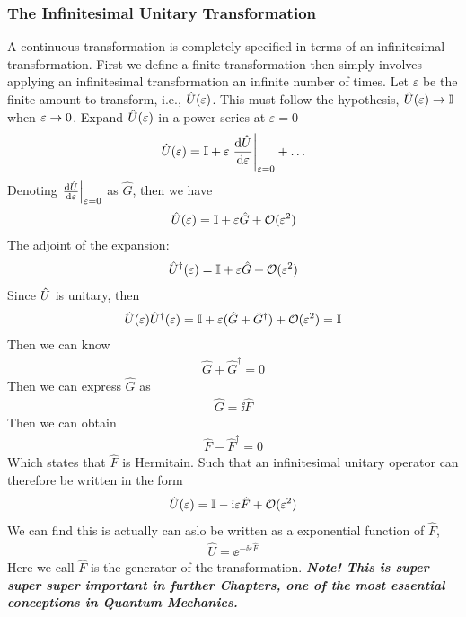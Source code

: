 \subsubsection{The Infinitesimal Unitary Transformation}
A continuous transformation is completely specified in terms of an infinitesimal transformation. First we define a finite transformation then simply involves applying an infinitesimal transformation an infinite number of times. Let $\varepsilon$ be the finite amount to transform, i.e., $\hat{U}(\varepsilon)$. This must follow the hypothesis, $\hat{U}(\varepsilon) \rightarrow \mathbb{I}$ when $\varepsilon \rightarrow 0$. Expand $\hat{U}(\varepsilon)$ in a power series at $\varepsilon=0$
\begin{eqnarray}
    \hat{U}(\varepsilon) = \mathbb{I} + \varepsilon \left. \frac{\mathrm{d} \hat{U}}{\mathrm{d}\varepsilon} \right|_{\varepsilon = 0} + \dots
\end{eqnarray}
Denoting $\left. \frac{\mathrm{d}\hat{U}}{\mathrm{d}\varepsilon} \right|_{\varepsilon = 0}$ as $\hat{G}$, then we have 
\begin{eqnarray}
    \hat{U}(\varepsilon) = \mathbb{I} + \varepsilon \hat{G} + \mathcal{O}(\varepsilon^2)
\end{eqnarray}
The adjoint of the expansion: 
\begin{eqnarray}
    \hat{U}^ \dag (\varepsilon) = \mathbb{I} + \varepsilon \hat{G} + \mathcal{O}(\varepsilon^2)
\end{eqnarray}
Since $\hat{U}$ is unitary, then 
\begin{eqnarray}
    \hat{U}(\varepsilon) \hat{U}^ \dag(\varepsilon) = \mathbb{I} + \varepsilon (\hat{G} + \hat{G}^ \dag) + \mathcal{O}(\varepsilon^2) = \mathbb{I}
\end{eqnarray}
Then we can know 
\begin{eqnarray}
    \hat{G} + \hat{G}^ \dag = 0
\end{eqnarray}
Then we can express $\hat{G}$ as 
\begin{eqnarray}
    \hat{G} = \ii \hat{F}
\end{eqnarray}
Then we can obtain 
\begin{eqnarray}
    \hat{F} - \hat{F}^ \dag =0
\end{eqnarray}
Which states that $\hat{F}$ is Hermitain. Such that an infinitesimal unitary operator can therefore be written in the form
\begin{eqnarray}
    \hat{U}(\varepsilon) = \mathbb{I} - \mathrm{i} \varepsilon \hat{F} + \mathcal{O}(\varepsilon^2) \label{eq:unitary_expansion}
\end{eqnarray}
We can find this is actually can aslo be written as a exponential function of $\hat{F}$,
\begin{eqnarray}
    \hat{U} = \ee^{- \ii \varepsilon \hat{F}} \label{eq:unitary_exponential}
\end{eqnarray}
Here we call $\hat{F}$ is the generator of the transformation. \emph{\textbf{Note! This is super super super important in further Chapters, one of the most essential conceptions in Quantum Mechanics.}}


